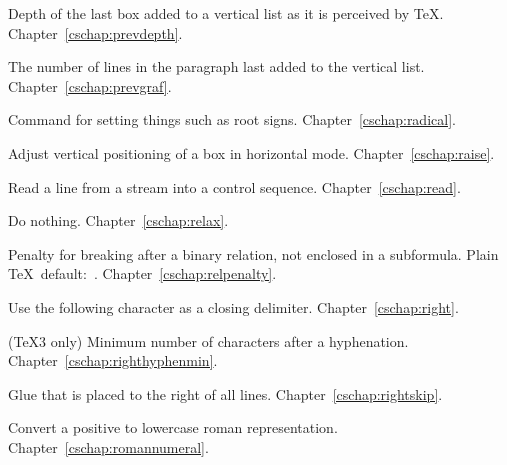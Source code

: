 \begin{glossinventory}
\item [\cs{prevdepth}] 
      Depth of the last box added to a vertical list as it is 
      perceived by \TeX.
Chapter~\ref{cschap:prevdepth}.

\item [\cs{prevgraf}] 
      The number of lines in the paragraph last
      added to the vertical list.
Chapter~\ref{cschap:prevgraf}.

\item [\cs{radical\gr{24-bit number}}]
      Command for setting things such as root signs.
Chapter~\ref{cschap:radical}.

\item [\cs{raise\gr{dimen}\gr{box}}]
      Adjust vertical positioning of a box in horizontal mode. 
Chapter~\ref{cschap:raise}.

\item [\cs{read\gr{number}\n{to}\gr{control sequence}}]
      Read a line from a stream into a control sequence.
Chapter~\ref{cschap:read}.

\item [\cs{relax}]
      Do nothing.
Chapter~\ref{cschap:relax}.

\item [\cs{relpenalty}]
      Penalty for breaking after a binary relation, not enclosed
      in a subformula.
      Plain \TeX\ default:~.
Chapter~\ref{cschap:relpenalty}.

\item [\cs{right}]
      Use the following character as a closing delimiter.
Chapter~\ref{cschap:right}.

\item [\cs{righthyphenmin}]
      (\TeX3 only) 
      Minimum number of characters after a hyphenation.
Chapter~\ref{cschap:righthyphenmin}.

\item [\cs{rightskip}]
      Glue that is placed to the right of all lines.
Chapter~\ref{cschap:rightskip}.

\item [\cs{romannumeral\gr{number}}]
      Convert a positive
       to lowercase roman representation.
Chapter~\ref{cschap:romannumeral}.


\end{glossinventory}
